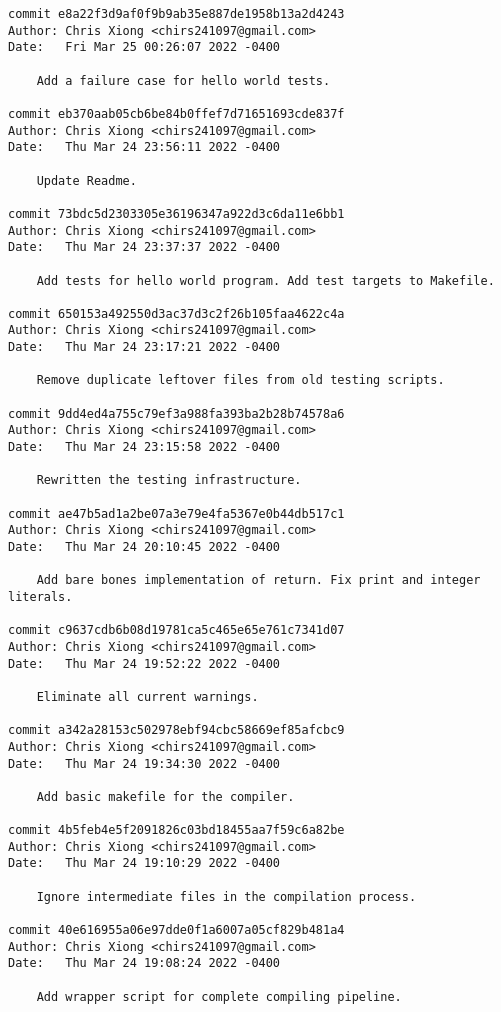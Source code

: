 {\begin{verbatim}
commit e8a22f3d9af0f9b9ab35e887de1958b13a2d4243
Author: Chris Xiong <chirs241097@gmail.com>
Date:   Fri Mar 25 00:26:07 2022 -0400

    Add a failure case for hello world tests.

commit eb370aab05cb6be84b0ffef7d71651693cde837f
Author: Chris Xiong <chirs241097@gmail.com>
Date:   Thu Mar 24 23:56:11 2022 -0400

    Update Readme.

commit 73bdc5d2303305e36196347a922d3c6da11e6bb1
Author: Chris Xiong <chirs241097@gmail.com>
Date:   Thu Mar 24 23:37:37 2022 -0400

    Add tests for hello world program. Add test targets to Makefile.

commit 650153a492550d3ac37d3c2f26b105faa4622c4a
Author: Chris Xiong <chirs241097@gmail.com>
Date:   Thu Mar 24 23:17:21 2022 -0400

    Remove duplicate leftover files from old testing scripts.

commit 9dd4ed4a755c79ef3a988fa393ba2b28b74578a6
Author: Chris Xiong <chirs241097@gmail.com>
Date:   Thu Mar 24 23:15:58 2022 -0400

    Rewritten the testing infrastructure.

commit ae47b5ad1a2be07a3e79e4fa5367e0b44db517c1
Author: Chris Xiong <chirs241097@gmail.com>
Date:   Thu Mar 24 20:10:45 2022 -0400

    Add bare bones implementation of return. Fix print and integer literals.

commit c9637cdb6b08d19781ca5c465e65e761c7341d07
Author: Chris Xiong <chirs241097@gmail.com>
Date:   Thu Mar 24 19:52:22 2022 -0400

    Eliminate all current warnings.

commit a342a28153c502978ebf94cbc58669ef85afcbc9
Author: Chris Xiong <chirs241097@gmail.com>
Date:   Thu Mar 24 19:34:30 2022 -0400

    Add basic makefile for the compiler.

commit 4b5feb4e5f2091826c03bd18455aa7f59c6a82be
Author: Chris Xiong <chirs241097@gmail.com>
Date:   Thu Mar 24 19:10:29 2022 -0400

    Ignore intermediate files in the compilation process.

commit 40e616955a06e97dde0f1a6007a05cf829b481a4
Author: Chris Xiong <chirs241097@gmail.com>
Date:   Thu Mar 24 19:08:24 2022 -0400

    Add wrapper script for complete compiling pipeline.


\end{verbatim}}
